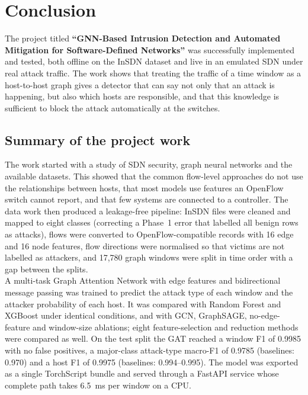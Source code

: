 \chapter{Conclusion}
The project titled \textbf{``GNN-Based Intrusion Detection and Automated Mitigation for Software-Defined Networks''} was successfully implemented and tested, both offline on the InSDN dataset and live in an emulated SDN under real attack traffic. The work shows that treating the traffic of a time window as a host-to-host graph gives a detector that can say not only that an attack is happening, but also which hosts are responsible, and that this knowledge is sufficient to block the attack automatically at the switches.\\

\section{Summary of the project work}
The work started with a study of SDN security, graph neural networks and the available datasets. This showed that the common flow-level approaches do not use the relationships between hosts, that most models use features an OpenFlow switch cannot report, and that few systems are connected to a controller. The data work then produced a leakage-free pipeline: InSDN files were cleaned and mapped to eight classes (correcting a Phase~1 error that labelled all benign rows as attacks), flows were converted to OpenFlow-compatible records with 16 edge and 16 node features, flow directions were normalised so that victims are not labelled as attackers, and 17,780 graph windows were split in time order with a gap between the splits.\\

A multi-task Graph Attention Network with edge features and bidirectional message passing was trained to predict the attack type of each window and the attacker probability of each host. It was compared with Random Forest and XGBoost under identical conditions, and with GCN, GraphSAGE, no-edge-feature and window-size ablations; eight feature-selection and reduction methods were compared as well. On the test split the GAT reached a window F1 of 0.9985 with no false positives, a major-class attack-type macro-F1 of 0.9785 (baselines: 0.970) and a host F1 of 0.9975 (baselines: 0.994--0.995). The model was exported as a single TorchScript bundle and served through a FastAPI service whose complete path takes 6.5~ms per window on a CPU.\\


